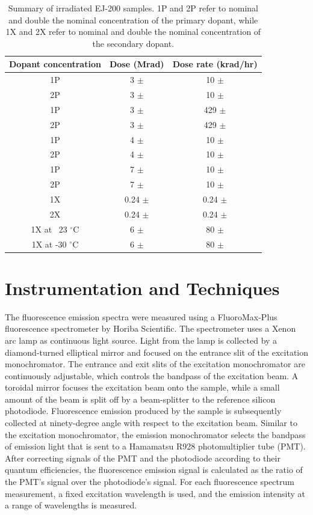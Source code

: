 \documentclass[preprint,12pt]{elsarticle}
\begin{document}
\begin{table}[!ht]
\centering
  \caption{Summary of irradiated EJ-200 samples. 
1P and 2P refer to nominal and double the nominal concentration of the primary dopant, 
while 1X and 2X refer to nominal and double the nominal concentration of the secondary dopant.}
  \begin{tabular}{c|c|c}
    \hline
    Dopant concentration 	    & Dose (Mrad)  		& Dose rate (krad/hr)    \\ \hline 
    1P     	    		    & 3 $\pm$  			& 10 $\pm$  	   	 \\ 
    2P     	    		    & 3 $\pm$  			& 10 $\pm$  	   	 \\ \hline
    1P				    & 3 $\pm$			& 429 $\pm$		 \\ 
    2P				    & 3 $\pm$			& 429 $\pm$		 \\ \hline
    1P     	    		    & 4 $\pm$  			& 10 $\pm$  	   	 \\ 
    2P     	    		    & 4 $\pm$  			& 10 $\pm$  	   	 \\ \hline
    1P				    & 7 $\pm$			& 10 $\pm$		 \\ 
    2P				    & 7 $\pm$			& 10 $\pm$		 \\ \hline
    1X     	    		    & 0.24 $\pm$  		& 0.24 $\pm$  	   	 \\ 
    2X     	    		    & 0.24 $\pm$  		& 0.24 $\pm$  	   	 \\ \hline
    1X at ~23 $^\circ$C		    & 6 $\pm$			& 80 $\pm$		 \\ 
    1X at -30 $^\circ$C		    & 6 $\pm$			& 80 $\pm$		 \\
    \hline
  \end{tabular}
  \label{table:samples}
\end{table}

\section{Instrumentation and Techniques}
The fluorescence emission spectra were measured using a FluoroMax-Plus fluorescence spectrometer by Horiba Scientific. 
The spectrometer uses a Xenon arc lamp as continuous light source. 
Light from the lamp is collected by a diamond-turned elliptical mirror and focused on the entrance slit of the excitation monochromator. 
The entrance and exit slits of the excitation monochromator are continuously adjustable, 
which controls the bandpass of the excitation beam. 
A toroidal mirror focuses the excitation beam onto the sample, while a small amount of the beam is split off by a beam-splitter 
to the reference silicon photodiode. 
Fluorescence emission produced by the sample is subsequently collected at ninety-degree angle with respect to the excitation beam. 
Similar to the excitation monochromator, the emission monochromator selects the bandpass of emission light that is sent to 
a Hamamatsu R928 photomultiplier tube (PMT). 
After correcting signals of the PMT and the photodiode according to their quantum efficiencies, 
the fluorescence emission signal is calculated as the ratio of the PMT's signal over the photodiode's signal. 
For each fluorescence spectrum measurement, a fixed excitation wavelength is used, 
and the emission intensity at a range of wavelengths is measured. 
\end{document}
